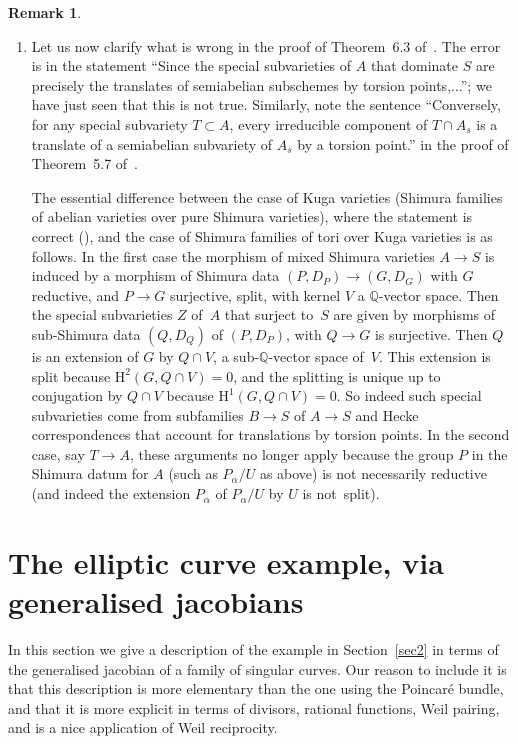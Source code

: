 \documentclass[JEP,XML,SOM,Unicode,NoFloatCountersInSection]{cedram}
\theoremstyle{plain}
\theoremstyle{definition}
\newtheorem{Remark}[subsection]{Remark}
\numberwithin{equation}{subsection}
\newcommand{\Q}{\mathbb Q}
\newcommand{\rmH}{\mathrm{H}}
\begin{document}
\begin{Remark}
\begin{enumerate}
see~\cite{BMPZ} and~\cite{Bertrand18}.
\item\label{rem_r_f_msv_item_4} Let us now clarify what is wrong in
the proof of Theorem~6.3 of~\cite{Pink2}. The error is in the
statement ``Since the special subvarieties of $A$ that dominate $S$
are precisely the translates of semiabelian subschemes by torsion
points,...''; we have just seen that this is not true. Similarly,
note the sentence ``Conversely, for any special subvariety $T\subset
A$, every irreducible component of $T\cap A_s$ is a translate of a
semiabelian subvariety of $A_s$ by a torsion point.'' in the proof
of Theorem~5.7 of~\cite{Pink2}.\enlargethispage{\baselineskip}%

The essential difference between the case of Kuga varieties (Shimura
families of abelian varieties over pure Shimura varieties), where
the statement is correct (\hbox{\cite[Prop.\,4.6]{Pink1}}), and the
case of Shimura families of tori over Kuga varieties is as
follows. In the first case the morphism of mixed Shimura varieties
$A\to S$ is induced by a morphism of Shimura data $(P,D_P)\to
(G,D_G)$ with $G$ reductive, and $P\to G$ surjective, split, with
kernel $V$ a $\Q$-vector space. Then the special subvarieties $Z$ of~$A$ that surject to~$S$ are given by morphisms of sub-Shimura data
$(Q,D_Q)$ of $(P,D_P)$, with $Q\to G$ is surjective. Then $Q$ is an
extension of $G$ by $Q\cap V$, a sub-$\Q$-vector space of~$V$. This
extension is split because $\rmH^2(G,Q\cap V)=0$, and the splitting
is unique up to conjugation by $Q\cap V$ because $\rmH^1(G,Q\cap
V)=0$. So indeed such special subvarieties come from subfamilies
$B\to S$ of $A\to S$ and Hecke correspondences that account for
translations by torsion points. In the second case, say $T\to A$,
these arguments no longer apply because the group $P$ in the Shimura
datum for $A$ (such as $P_\alpha/U$ as above) is not necessarily
reductive (and indeed the extension $P_\alpha$ of $P_\alpha/U$ by
$U$ is not~split).
\end{enumerate}
\end{Remark}

\section{The elliptic curve example, via generalised
jacobians}\label{sec6}

In this section we give a description of the example in
Section~\ref{sec2} in terms of the generalised jacobian of a family of
singular curves. Our reason to include it is that this description is
more elementary than the one using the Poincaré bundle, and that it
is more explicit in terms of divisors, rational functions, Weil
pairing, and is a nice application of Weil reciprocity.
\end{document}
